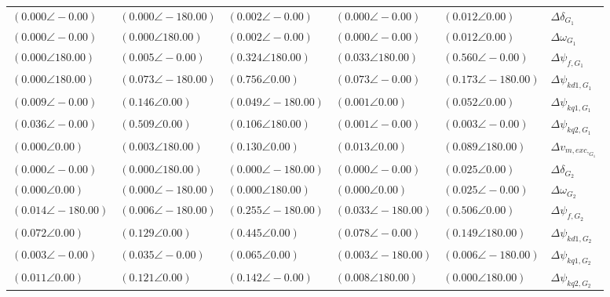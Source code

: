 \begin{tabular}{lllll|l}
$(0.000 \angle -0.00)$	& $(0.000 \angle -180.00)$	& $(0.002 \angle -0.00)$	& $(0.000 \angle -0.00)$	& $(0.012 \angle 0.00)$	& $\Delta\delta_{G_1}$ \\ 
$(0.000 \angle -0.00)$	& $(0.000 \angle 180.00)$	& $(0.002 \angle -0.00)$	& $(0.000 \angle -0.00)$	& $(0.012 \angle 0.00)$	& $\Delta\omega_{G_1}$ \\ 
$(0.000 \angle 180.00)$	& $(0.005 \angle -0.00)$	& $\mathbf{(0.324 \angle 180.00)}$	& $(0.033 \angle 180.00)$	& $\mathbf{(0.560 \angle -0.00)}$	& $\Delta \psi_{f,G_1}$ \\ 
$(0.000 \angle 180.00)$	& $\mathbf{(0.073 \angle -180.00)}$	& $\mathbf{(0.756 \angle 0.00)}$	& $\mathbf{(0.073 \angle -0.00)}$	& $\mathbf{(0.173 \angle -180.00)}$	& $\Delta \psi_{kd1,G_1}$ \\ 
$(0.009 \angle -0.00)$	& $\mathbf{(0.146 \angle 0.00)}$	& $(0.049 \angle -180.00)$	& $(0.001 \angle 0.00)$	& $\mathbf{(0.052 \angle 0.00)}$	& $\Delta \psi_{kq1,G_1}$ \\ 
$(0.036 \angle -0.00)$	& $\mathbf{(0.509 \angle 0.00)}$	& $\mathbf{(0.106 \angle 180.00)}$	& $(0.001 \angle -0.00)$	& $(0.003 \angle -0.00)$	& $\Delta \psi_{kq2,G_1}$ \\ 
$(0.000 \angle 0.00)$	& $(0.003 \angle 180.00)$	& $\mathbf{(0.130 \angle 0.00)}$	& $(0.013 \angle 0.00)$	& $\mathbf{(0.089 \angle 180.00)}$	& $\Delta v_{m,exc,_{G_1}}$ \\ 
 \hline 
$(0.000 \angle -0.00)$	& $(0.000 \angle 180.00)$	& $(0.000 \angle -180.00)$	& $(0.000 \angle -0.00)$	& $(0.025 \angle 0.00)$	& $\Delta\delta_{G_2}$ \\ 
$(0.000 \angle 0.00)$	& $(0.000 \angle -180.00)$	& $(0.000 \angle 180.00)$	& $(0.000 \angle 0.00)$	& $(0.025 \angle -0.00)$	& $\Delta\omega_{G_2}$ \\ 
$(0.014 \angle -180.00)$	& $(0.006 \angle -180.00)$	& $\mathbf{(0.255 \angle -180.00)}$	& $(0.033 \angle -180.00)$	& $\mathbf{(0.506 \angle 0.00)}$	& $\Delta \psi_{f,G_2}$ \\ 
$\mathbf{(0.072 \angle 0.00)}$	& $\mathbf{(0.129 \angle 0.00)}$	& $\mathbf{(0.445 \angle 0.00)}$	& $\mathbf{(0.078 \angle -0.00)}$	& $\mathbf{(0.149 \angle 180.00)}$	& $\Delta \psi_{kd1,G_2}$ \\ 
$(0.003 \angle -0.00)$	& $(0.035 \angle -0.00)$	& $\mathbf{(0.065 \angle 0.00)}$	& $(0.003 \angle -180.00)$	& $(0.006 \angle -180.00)$	& $\Delta \psi_{kq1,G_2}$ \\ 
$(0.011 \angle 0.00)$	& $\mathbf{(0.121 \angle 0.00)}$	& $\mathbf{(0.142 \angle -0.00)}$	& $(0.008 \angle 180.00)$	& $(0.000 \angle 180.00)$	& $\Delta \psi_{kq2,G_2}$ \\ 

\end{tabular}
